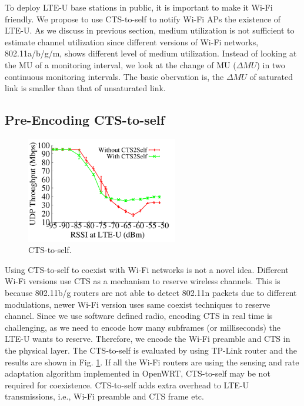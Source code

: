 

To deploy LTE-U base stations in public,
it is important to make it Wi-Fi friendly.  
We propose to use CTS-to-self to notify Wi-Fi APs the existence
of LTE-U. 
As we discuss in previous section, medium utilization is not sufficient
to estimate channel utilization since different 
versions of Wi-Fi networks, 802.11a/b/g/m, 
shows different level of medium utilization. 
Instead of looking at the MU of a monitoring interval, 
we look at the change of MU ($\Delta{MU}$) in two continuous monitoring intervals. 
The basic obervation is, the $\Delta{MU}$ of saturated link is smaller
than that of unsaturated link. 


\subsection{Pre-Encoding CTS-to-self}


\begin{figure}[!ht]
 \centering
    \includegraphics[width=2.6in]{./figures/cts2self_power}
 \caption{CTS-to-self.}
  \label{fig:cts2self_power}
\end{figure}

Using CTS-to-self to coexist with Wi-Fi networks is not a novel idea. 
Different Wi-Fi versions use CTS as a mechanism to reserve 
wireless channels. 
This is because 802.11b/g routers are not able to detect
802.11n packets due to different modulations, 
newer Wi-Fi version uses same coexist techniques to 
reserve channel. 
Since we use software defined radio, encoding CTS
in real time is challenging, 
as we need to encode how many subframes (or milliseconds) the LTE-U wants
to reserve. 
Therefore, we encode the Wi-Fi preamble and CTS in the physical layer. 
The CTS-to-self is evaluated by using TP-Link router
and the results are shown in Fig. \ref{fig:cts2self_power}.
If all the Wi-Fi routers are using the sensing and 
rate adaptation algorithm implemented in OpenWRT, 
CTS-to-self may be not required for coexistence. 
CTS-to-self adds extra overhead to LTE-U transmissions,
i.e., Wi-Fi preamble and CTS frame etc. 



